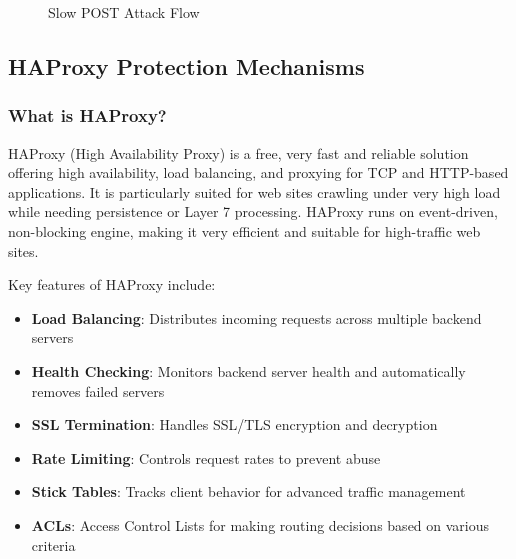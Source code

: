 \documentclass[12pt]{article}
\begin{document}
\begin{figure}[H]
\centering
{}
\caption{Slow POST Attack Flow}
\label{fig:slowpost}
\end{figure}

\subsection{HAProxy Protection Mechanisms}

\subsubsection{What is HAProxy?}
HAProxy (High Availability Proxy) is a free, very fast and reliable solution offering high availability, load balancing, and proxying for TCP and HTTP-based applications. It is particularly suited for web sites crawling under very high load while needing persistence or Layer 7 processing. HAProxy runs on event-driven, non-blocking engine, making it very efficient and suitable for high-traffic web sites.

Key features of HAProxy include:
\begin{itemize}
    \item \textbf{Load Balancing}: Distributes incoming requests across multiple backend servers
    \item \textbf{Health Checking}: Monitors backend server health and automatically removes failed servers
    \item \textbf{SSL Termination}: Handles SSL/TLS encryption and decryption
    \item \textbf{Rate Limiting}: Controls request rates to prevent abuse
    \item \textbf{Stick Tables}: Tracks client behavior for advanced traffic management
    \item \textbf{ACLs}: Access Control Lists for making routing decisions based on various criteria
\end{itemize}
\end{document}
